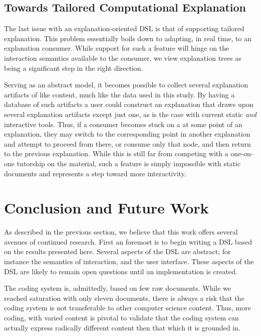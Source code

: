 \documentclass[sigconf]{acmart}
\begin{document}
\subsection{Towards Tailored Computational Explanation}
\label{sec:dis:tail}
The last issue with an explanation-oriented DSL is that of supporting tailored
explanation. This problem essentially boils down to adapting, in real time, to
an explanation consumer. While support for such a feature will hinge on the
interaction semantics available to the consumer, we view explanation trees as
being a significant step in the right direction.

Serving as an abstract model, it becomes possible to collect several explanation
artifacts of like content, much like the data used in this study. By having a
database of such artifacts a user could construct an explanation that draws upon
several explanation artifacts except just one, as is the case with current
static \emph{and} interactive tools. Thus, if a consumer becomes stuck on a
at some point of an explanation, they may switch to the corresponding point in
another explanation and attempt to proceed from there, or consume only that
node, and then return to the previous explanation. While this is still far from
competing with a one-on-one tutorship on the material, such a feature is simply
impossible with static documents and represents a step toward more interactivity.

\section{Conclusion and Future Work}

As described in the previous section, we believe that this work offers several
avenues of continued research. First an foremost is to begin writing a DSL based
on the results presented here. Several aspects of the DSL are abstract; for
instance the semantics of interaction, and the user interface. These aspects of
the DSL are likely to remain open questions until an implementation is created. 

The coding system is, admittedly, based on few raw documents. While we reached
saturation with only eleven documents, there is always a risk that the coding
system is not transferable to other computer science content. Thus, more coding,
with varied content is pivotal to validate that the coding system can actually
express radically different content then that which it is grounded in.



\end{document}
